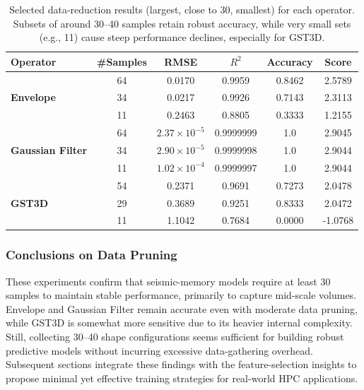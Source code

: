 \begin{table}[htbp]
    \centering
    \begin{tabular}{lccccc}
        \hline
        \textbf{Operator} & \textbf{\#Samples} & \textbf{\ac{RMSE}}    & \textbf{$R^2$} & \textbf{Accuracy} & \textbf{Score} \\
        \hline
        \multirow{3}{*}{\textbf{Envelope}}
        & 64                 & 0.0170                & 0.9959         & 0.8462            & 2.5789         \\
        & 34                 & 0.0217                & 0.9926         & 0.7143            & 2.3113         \\
        & 11                 & 0.2463                & 0.8805         & 0.3333            & 1.2155         \\
        \hline
        \multirow{3}{*}{\textbf{Gaussian Filter}}
        & 64                 & \(2.37\times10^{-5}\) & 0.9999999      & 1.0               & 2.9045         \\
        & 34                 & \(2.90\times10^{-5}\) & 0.9999998      & 1.0               & 2.9044         \\
        & 11                 & \(1.02\times10^{-4}\) & 0.9999997      & 1.0               & 2.9044         \\
        \hline
        \multirow{3}{*}{\textbf{\ac{GST3D}}}
        & 54                 & 0.2371                & 0.9691         & 0.7273            & 2.0478         \\
        & 29                 & 0.3689                & 0.9251         & 0.8333            & 2.0472         \\
        & 11                 & 1.1042                & 0.7684         & 0.0000            & -1.0768        \\
        \hline
    \end{tabular}
    \caption{Selected data-reduction results (largest, close to 30, smallest) for each operator.
    Subsets of around 30--40 samples retain robust accuracy, while very small sets
        (e.g., 11) cause steep performance declines, especially for \ac{GST3D}.}
    \label{tab:data_reduction_summary}
\end{table}

\subsubsection{Conclusions on Data Pruning}
\label{subsec:data-reduction-conclusions}

These experiments confirm that seismic-memory models require at least 30 samples to maintain stable performance, primarily to capture mid-scale volumes.
Envelope and Gaussian Filter remain accurate even with moderate data pruning, while \ac{GST3D} is somewhat more sensitive due to its heavier internal complexity.
Still, collecting 30–40 shape configurations seems sufficient for building robust predictive models without incurring excessive data-gathering overhead.
Subsequent sections integrate these findings with the feature-selection insights to propose minimal yet effective training strategies for real-world \ac{HPC} applications.